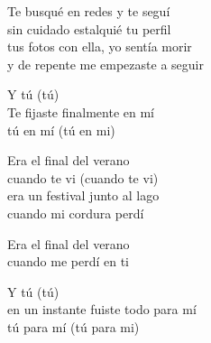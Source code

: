 \begin{lyrics}
Te busqué en redes y te seguí\\
sin cuidado estalquié tu perfil\\
tus fotos con ella, yo sentía morir\\
y de repente me empezaste a seguir

Y tú (tú)\\
Te fijaste finalmente en mí\\
tú en mí (tú en mi)

Era el final del verano\\
cuando te vi (cuando te vi)\\
era un festival junto al lago\\
cuando mi cordura perdí

Era el final del verano\\
cuando me perdí en ti

Y tú (tú)\\
en un instante fuiste todo para mí\\
tú para mí (tú para mi)
\end{lyrics}

